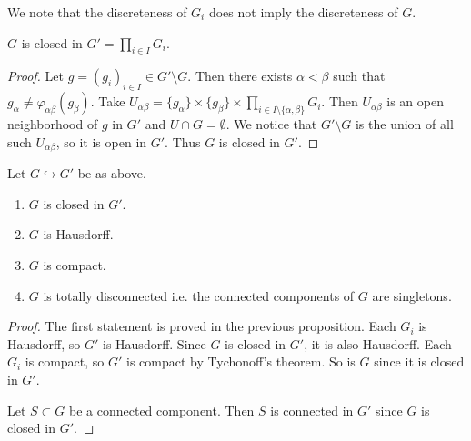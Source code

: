 We note that the discreteness of $G_i$ does not imply the discreteness of $G$.

\begin{proposition}
    $G$ is closed in $G'=\prod_{i \in I} G_i$.
\end{proposition}
\begin{proof}
    Let $g = (g_i)_{i \in I} \in G' \setminus G$.
    Then there exists $\alpha<\beta$ such that $g_\alpha \neq \varphi_{\alpha\beta}(g_\beta)$.
    Take $U_{\alpha\beta} = \{g_\alpha\} \times \{g_\beta\} \times \prod_{i \in I \setminus \{\alpha, \beta\}} G_i$.
    Then $U_{\alpha\beta}$ is an open neighborhood of $g$ in $G'$ and $U \cap G = \emptyset$.
    We notice that $G'\setminus G$ is the union of all such $U_{\alpha\beta}$, so it is open in $G'$.
    Thus $G$ is closed in $G'$.
\end{proof}

\begin{proposition}
    Let $G \hookrightarrow G'$ be as above.
    \begin{enumerate}
        \item $G$ is closed in $G'$.
        \item $G$ is Hausdorff.
        \item $G$ is compact.
        \item $G$ is totally disconnected i.e. the connected components of $G$ are singletons.
    \end{enumerate}
\end{proposition}
\begin{proof}
    The first statement is proved in the previous proposition.
    Each $G_i$ is Hausdorff, so $G'$ is Hausdorff.
    Since $G$ is closed in $G'$, it is also Hausdorff.
    Each $G_i$ is compact, so $G'$ is compact by Tychonoff's theorem.
    So is $G$ since it is closed in $G'$.

    Let $S \subset G$ be a connected component.
    Then $S$ is connected in $G'$ since $G$ is closed in $G'$.
\end{proof}